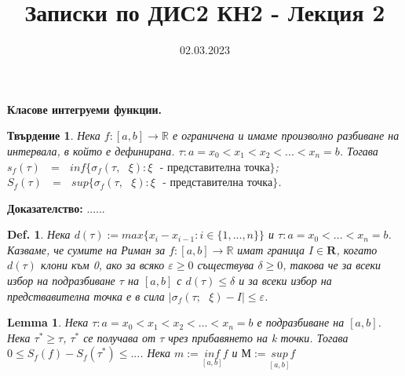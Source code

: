 \documentclass[12pt]{article}
\newtheorem{proposition}{Твърдение}
\newtheorem{definition}{Def.}
\newtheorem{lemma}{Lemma}
\newcommand{\spc}{\text{ }}
\begin{document}
	\color{white}
	\pagecolor{darkgray}
	\title{Записки по ДИС2 КН2 - Лекция 2}
	\date{02.03.2023}
	\maketitle
	\begin{center}
		\Large
		\textbf{Класове интегруеми функции. }
	\end{center}

	\begin{proposition}
		Нека $f:\left[a, b\right] \rightarrow \mathbb{R}$ е ограничена и имаме произволно разбиване на интервала, в който е дефинирана.
		$\tau : a=x_{0}<x_{1}<x_{2}<...<x_{n}=b$.
		Тогава $s_{f}\left(\tau\right)\spc=\spc inf\{\sigma_{f}\left(\tau,\spc\xi\right) : \xi\spc\text{- представителна точка}\}$;
		$S_{f}\left(\tau\right)\spc=\spc sup\{\sigma_{f}\left(\tau,\spc\xi\right) : \xi\spc\text{- представителна точка}\}$.
	\end{proposition}
	\textbf{Доказателство:} ......
	
	\begin{definition}
		Нека $d\left(\tau\right) := max\{x_{i}-x_{i-1} : i\in\{1,...,n\}\}$ и $\tau : a=x_{0}<...<x_{n}=b$. Казваме, че сумите на Риман за $f: \left[a, b\right] \rightarrow \mathbb{R}$ имат граница $I\in\mathbf{R}$, когато $d\left(\tau\right)$ клони към 0, ако за всяко $\varepsilon\geq 0$ съществува $\delta\geq 0$, такова че за всеки избор на подразбиване $\tau$ на $\left[a, b\right]$ с $d\left(\tau\right)\leq\delta$ и за всеки избор на предствавителна точка е в сила $|\sigma_{f}\left(\tau;\spc\xi\right)-I|\leq\varepsilon$.
	\end{definition}
	
	\begin{lemma}
		Нека $\tau : a=x_{0}<x_{1}<x_{2}<...<x_{n}=b$ е подразбиване на $\left[a, b\right]$. Нека $\tau^{*}\geq\tau$, $\tau^{*}$ се получава от $\tau$ чрез прибавянето на k точки. Тогава $0\leq S_{f}\left(f\right)-S_{f}\left(\tau^{*}\right)\leq...$.
		Нека $m := \underset{\left[a, b\right]}{inf} f$ и $М := \underset{\left[a, b\right]}{sup} f$
	\end{lemma}
\end{document}
